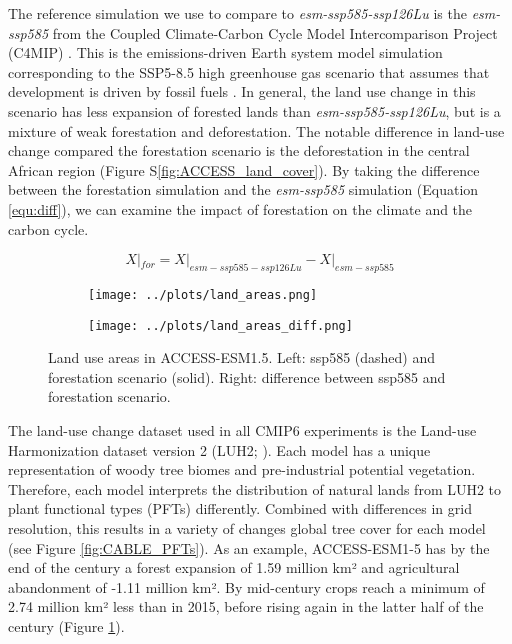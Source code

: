 \documentclass[]{article}
\begin{document}
The reference simulation we use to compare to \textit{esm-ssp585-ssp126Lu} is the \textit{esm-ssp585} from the Coupled Climate-Carbon Cycle Model Intercomparison Project (C4MIP) \parencite{jones_c4mip_2016}.
This is the emissions-driven Earth system model simulation corresponding to the SSP5-8.5 high greenhouse gas scenario that assumes that development is driven by fossil fuels \parencite{oneill_scenario_2016}.
In general, the land use change in this scenario has less expansion of forested lands than \textit{esm-ssp585-ssp126Lu}, but is a mixture of weak forestation and deforestation.
The notable difference in land-use change compared the forestation scenario is the deforestation in the central African region (Figure S\ref{fig:ACCESS_land_cover}).
By taking the difference between the forestation simulation and the \textit{esm-ssp585} simulation (Equation \ref{equ:diff}), we can examine the impact of forestation on the climate and the carbon cycle.

\begin{equation}
    X|_{for} = X|_{esm-ssp585-ssp126Lu} - X|_{esm-ssp585}
    \label{equ:diff}
\end{equation}

\begin{figure}[H]
    \centering
    \begin{subfigure}[b]{0.45\linewidth}
        \texttt{[image: ../plots/land\_areas.png]}
    \end{subfigure}
    \begin{subfigure}[b]{0.45\linewidth}

        \texttt{[image: ../plots/land\_areas\_diff.png]}
    \end{subfigure}
    \caption{Land use areas in ACCESS-ESM1.5. Left: ssp585 (dashed) and forestation scenario (solid). Right: difference between ssp585 and forestation scenario.}
    \label{fig:land_use}
\end{figure}

The land-use change dataset used in all CMIP6 experiments is the Land-use Harmonization dataset version 2 (LUH2; \cite{hurtt_harmonization_2020}).
Each model has a unique representation of woody tree biomes and pre-industrial potential vegetation.
Therefore, each model interprets the distribution of natural lands from LUH2 to plant functional types (PFTs) differently.
Combined with differences in grid resolution, this results in a variety of changes global tree cover for each model (see Figure \ref{fig:CABLE_PFTs}).
As an example, ACCESS-ESM1-5 has by the end of the century a forest expansion of 1.59 million km² and agricultural abandonment of -1.11 million km².
By mid-century crops reach a minimum of 2.74 million km² less than in 2015, before rising again in the latter half of the century (Figure \ref{fig:land_use}).
\end{document}
